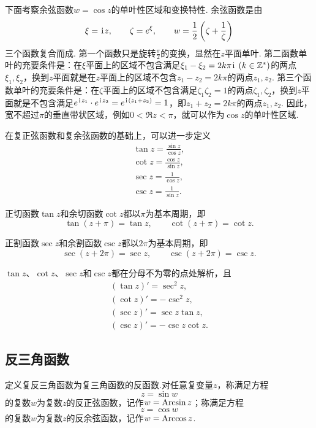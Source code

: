 下面考察余弦函数\(w = \cos z\)的单叶性区域和变换特性.
余弦函数是由\[
\xi = \kern1pt\mathrm{i}\kern1pt z,
\qquad
\zeta = e^{\xi},
\qquad
w = \frac{1}{2} \left( \zeta + \frac{1}{\zeta} \right)
\]三个函数复合而成.
第一个函数只是旋转\(\frac{\pi}{2}\)的变换，显然在\(z\)平面单叶.
第二函数单叶的充要条件是：在\(\xi\)平面上的区域不包含满足\(\xi_1 - \xi_2 = 2k\pi\iu\ (k\in\mathbb{Z}^*)\)的两点\(\xi_1,\xi_2\)，换到\(z\)平面就是在\(z\)平面上的区域不包含\(z_1 - z_2 = 2k\pi\)的两点\(z_1,z_2\).
第三个函数单叶的充要条件是：在\(\zeta\)平面上的区域不包含满足\(\zeta_1 \zeta_2 = 1\)的两点\(\zeta_1,\zeta_2\)，换到\(z\)平面就是不包含满足\(e^{\kern1pt\mathrm{i}\kern1pt z_1} \cdot e^{\kern1pt\mathrm{i}\kern1pt z_2} = e^{\kern1pt\mathrm{i}\kern1pt(z_1+z_2)} = 1\)，即\(z_1 + z_2 = 2k\pi\)的两点\(z_1,z_2\).
因此，宽不超过\(\pi\)的垂直带状区域，例如\(0 < \Re z < \pi\)，就可以作为\(\cos z\)的单叶性区域.

\begin{definition}
在复正弦函数和复余弦函数的基础上，可以进一步定义\begin{gather}
\tan z = \frac{\sin z}{\cos z}, \\
\cot z = \frac{\cos z}{\sin z}, \\
\sec z = \frac{1}{\cos z}, \\
\csc z = \frac{1}{\sin z}.
\end{gather}
\end{definition}

\begin{property}
正切函数\(\tan z\)和余切函数\(\cot z\)都以\(\pi\)为基本周期，即\[
\tan(z+\pi) = \tan z,
\qquad
\cot(z+\pi) = \cot z.
\]

正割函数\(\sec z\)和余割函数\(\csc z\)都以\(2\pi\)为基本周期，即\[
\sec(z+2\pi) = \sec z,
\qquad
\csc(z+2\pi) = \csc z.
\]
\end{property}

\begin{property}
\(\tan z\)、\(\cot z\)、\(\sec z\)和\(\csc z\)都在分母不为零的点处解析，且\begin{gather}
(\tan z)' = \sec^2 z, \label{equation:解析函数.正切函数的导数} \\
(\cot z)' = -\csc^2 z, \label{equation:解析函数.余切函数的导数} \\
(\sec z)' = \sec z \tan z, \label{equation:解析函数.正割函数的导数} \\
(\csc z)' = -\csc z \cot z. \label{equation:解析函数.余割函数的导数}
\end{gather}
\end{property}

\subsection{反三角函数}
\begin{definition}
定义复反三角函数为复三角函数的反函数.对任意复变量\(z\)，称满足方程\[
z = \sin w
\]的复数\(w\)为复数\(z\)的反正弦函数，记作\(w = \operatorname{Arcsin} z\)；称满足方程\[
z = \cos w
\]的复数\(w\)为复数\(z\)的反余弦函数，记作\(w = \operatorname{Arccos} z\).
\end{definition}

